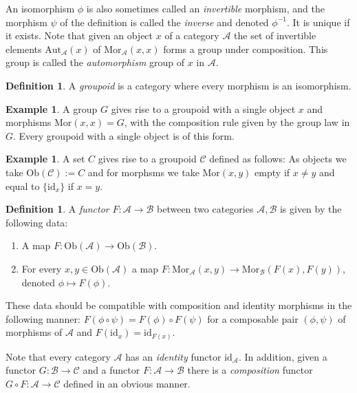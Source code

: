 \documentclass{amsart}
\theoremstyle{definition}
\newtheorem{definition}[theorem]{Definition}
\newtheorem{example}[theorem]{Example}
\theoremstyle{remark}
\numberwithin{equation}{subsection}
\begin{document}
\noindent
An isomorphism $\phi$ is also sometimes called an {\it invertible}
morphism, and the morphism $\psi$ of the definition is called the
{\it inverse} and denoted $\phi^{-1}$. It is unique if it exists. Note that
given an object $x$ of a category $\mathcal{A}$ the set of invertible
elements $\text{Aut}_{\mathcal{A}}(x)$
of $\text{Mor}_{\mathcal{A}}(x,x)$ forms a group under composition. 
This group is called the {\it automorphism} group of $x$ in $\mathcal{A}$.

\begin{definition} 
\label{definition-groupoid}
A {\it groupoid} is a category where every morphism is an isomorphism.
\end{definition}

\begin{example}
\label{example-group-groupoid}
A group $G$ gives rise to a groupoid with a single object $x$
and morphisms $\text{Mor}(x,x) = G$, with the composition rule
given by the group law in $G$. Every groupoid with a single
object is of this form.
\end{example}

\begin{example}
\label{example-set-groupoid}
A set $C$ gives rise to a groupoid $\mathcal{C}$ defined as follows:
As objects we take $\text{Ob}(\mathcal{C}) := C$ and for morphsms
we take $\text{Mor}(x,y)$ empty if $x\neq y$ and equal to
$\{\text{id}_x\}$ if $x=y$.
\end{example}

\begin{definition}
\label{definition-functor}
A {\it functor} $F : \mathcal{A} \to \mathcal{B}$
between two categories $\mathcal{A}, \mathcal{B}$ is given by the
following data:
\begin{enumerate}
\item A map $F : \text{Ob}(\mathcal{A}) \to \text{Ob}(\mathcal{B})$.
\item For every $x,y \in \text{Ob}(\mathcal{A})$ a map
$F : \text{Mor}_\mathcal{A}(x,y) \to \text{Mor}_\mathcal{B}(F(x), F(y))$,
denoted $\phi \mapsto F(\phi)$.
\end{enumerate}
These data should be compatible with composition and identity morphisms
in the following manner: $F(\phi \circ \psi) =
F(\phi) \circ F(\psi)$ for a composable pair $(\phi, \psi)$ of
morphisms of $\mathcal{A}$ and $F(\text{id}_x) = \text{id}_{F(x)}$.
\end{definition}

\noindent
Note that every category $\mathcal{A}$ has an
{\it identity} functor $\text{id}_\mathcal{A}$.
In addition, given a functor $G : \mathcal{B} \to \mathcal{C}$
and a functor $F : \mathcal{A} \to \mathcal{B}$ there is
a {\it composition} functor $G \circ F : \mathcal{A} \to \mathcal{C}$
defined in an obvious manner.
\end{document}

